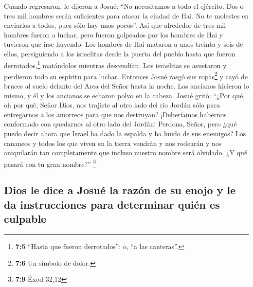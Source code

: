  Cuando regresaron, le dijeron a Josué: ``No necesitamos a
todo el ejército. Dos o tres mil hombres serán suficientes para atacar
la ciudad de Hai. No te molestes en enviarlos a todos, pues sólo hay
unos pocos''.  Así que alrededor de tres mil hombres
fueron a luchar, pero fueron golpeados por los hombres de Hai y tuvieron
que irse huyendo.  Los hombres de Hai mataron a unos
treinta y seis de ellos, persiguiendo a los israelitas desde la puerta
del pueblo hasta que fueron derrotados,\footnote{\textbf{7:5} ``Hasta
  que fueron derrotados'': o, ``a las canteras''.} matándolos mientras
descendían. Los israelitas se asustaron y perdieron todo su espíritu
para luchar.  Entonces Josué rasgó sus ropas\footnote{\textbf{7:6}
  Un símbolo de dolor.} y cayó de bruces al suelo delante del Arca del
Señor hasta la noche. Los ancianos hicieron lo mismo, y él y los
ancianos se echaron polvo en la cabeza.  Josué gritó:
``¿Por qué, oh por qué, Señor Dios, nos trajiste al otro lado del río
Jordán sólo para entregarnos a los amorreos para que nos destruyan?
¡Deberíamos habernos conformado con quedarnos al otro lado del Jordán!
 Perdona, Señor, pero ¿qué puedo decir ahora que Israel ha
dado la espalda y ha huido de sus enemigos?  Los cananeos
y todos los que viven en la tierra vendrán y nos rodearán y nos
aniquilarán tan completamente que incluso nuestro nombre será olvidado.
¿Y qué pasará con tu gran nombre?'' \footnote{\textbf{7:9} Éxod 32,12}

\hypertarget{dios-le-dice-a-josuuxe9-la-razuxf3n-de-su-enojo-y-le-da-instrucciones-para-determinar-quiuxe9n-es-culpable}{%
\subsection{Dios le dice a Josué la razón de su enojo y le da
instrucciones para determinar quién es
culpable}\label{dios-le-dice-a-josuuxe9-la-razuxf3n-de-su-enojo-y-le-da-instrucciones-para-determinar-quiuxe9n-es-culpable}}

